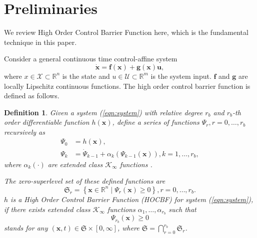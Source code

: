 \documentclass{ifacconf}
\newtheorem{definition}{Definition}
\begin{document}
\section{Preliminaries}
\par We review High Order Control Barrier Function here, which is the fundamental technique in this paper.

Consider a general continuous time control-affine system
\begin{equation} \label{eqn:system}
  \dot{\boldsymbol{x}} = \boldsymbol{f}(\boldsymbol{x}) + \boldsymbol{g}(\boldsymbol{x}) \boldsymbol{u} ,
\end{equation}
where $x \in \mathcal{X} \subset \mathbb{R}^n$ is the state and $u \in \mathcal{U} \subset \mathbb{R}^m$ is the system input. $\boldsymbol{f}$ and $\boldsymbol{g}$ are locally Lipschitz continuous functions. The high order control barrier function is defined as follows.

\begin{definition}\label{def:HOCBF}
   Given a system (\ref{eqn:system}) with relative degree $r_b$ and $r_b$-th order differentiable function $h(\boldsymbol{x})$, define a series of functions $\Psi_r, r = 0, \dots, r_b$ recursively as
   \begin{equation} \label{eqn:cbfRecursive}
     \begin{aligned}
       \Psi_0 &= h(\boldsymbol{x}), \\
       \Psi_k &= \dot{\Psi}_{k-1} + \alpha_k\left( \Psi_{k-1}(\boldsymbol{x}) \right), k = 1,\dots,r_b,
     \end{aligned}
   \end{equation}
   where $\alpha_k(\cdot)$ are extended class $\mathcal{K}_{\infty}$ functions \footnotemark. 
   
   \par The zero-superlevel set of these defined functions are
   \begin{equation}
     \mathfrak{S}_r = \left\{ \boldsymbol{x} \in \mathbb{R}^n \mid \Psi_r(\boldsymbol{x}) \ge 0 \right\}, r = 0,\dots,r_b.
   \end{equation}
   $h$ is a \textit{High Order Control Barrier Function (HOCBF)} for system (\ref{eqn:system}), if there exists extended class $\mathcal{K}_{\infty}$ functions $\alpha_1, \dots, \alpha_{r_b}$ such that
   \begin{equation} \label{eqn:cbfConstraint}
     \Psi_{r_b}(\boldsymbol{x}) \ge 0
   \end{equation}
   stands for any $(\boldsymbol{x},t) \in \mathfrak{S} \times [0,\infty]$, where $\mathfrak{S} = \bigcap_{r = 0}^{r_b} \mathfrak{S}_r$. 

\end{definition}
\end{document}
